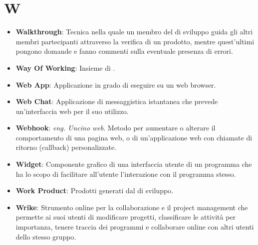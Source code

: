 \section*{W}
\begin{itemize}
	\item
	\textbf{Walkthrough}: Tecnica nella quale un membro del  di sviluppo guida gli altri membri partecipanti attraverso la verifica di un prodotto, mentre quest'ultimi pongono domande e fanno commenti sulla eventuale presenza di errori.
	\item
	\textbf{Way Of Working}: Insieme di .
	\item
	\textbf{Web App}: Applicazione in grado di eseguire su un web browser.
	\item
	\textbf{Web Chat}: Applicazione di messaggistica istantanea che prevede un'interfaccia web per il suo utilizzo.
	\item
	\textbf{Webhook}: \textit{eng. Uncino web}. Metodo per aumentare o alterare il comportamento di una pagina web, o di un'applicazione web con chiamate di ritorno (callback) personalizzate.
	\item
	\textbf{Widget}: Componente grafico di una interfaccia utente di un programma che ha lo scopo di facilitare all'utente l'interazione con il programma stesso.
	\item
	\textbf{Work Product}: Prodotti generati dal  di sviluppo.
	\item
	\textbf{Wrike}: Strumento online per la collaborazione e il project management che permette ai suoi utenti di modificare progetti, classificare le attività per importanza, tenere traccia dei programmi e collaborare online con altri utenti dello stesso gruppo.
\end{itemize}
\newpage